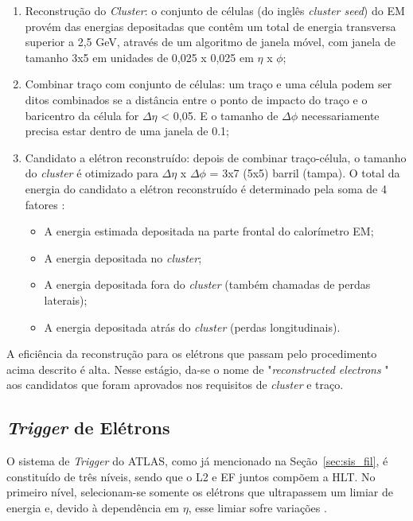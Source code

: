 \begin{enumerate}
  \item Reconstrução do \emph{Cluster}: o conjunto de células (do inglês \emph{cluster seed}) do EM provém das energias depositadas que contêm um total de energia transversa superior a 2,5 GeV, através de um algoritmo de janela móvel, com janela de tamanho 3x5 em unidades de 0,025 x 0,025 em $\eta$ x $\phi$;
  \item Combinar traço com conjunto de células: um traço e uma célula podem ser ditos combinados se a distância entre o ponto de impacto do traço e o baricentro da célula for $\Delta$$\eta$ < 0,05. E o tamanho de $\Delta$$\phi$ necessariamente precisa estar dentro de uma janela de 0.1;
  \item Candidato a elétron reconstruído: depois de combinar traço-célula, o tamanho do \emph{cluster} é otimizado para $\Delta$$\eta$ x $\Delta$$\phi$ = 3x7 (5x5) barril (tampa). O total da energia do candidato a elétron reconstruído é determinado pela soma de 4 fatores \cite{abat2008expected}:
      \begin{itemize}
        \item A energia estimada depositada na parte frontal do calorímetro EM;
        \item A energia depositada no \emph{cluster};
        \item A energia depositada fora do \emph{cluster} (também chamadas de perdas laterais);
        \item A energia depositada atrás do \emph{cluster} (perdas longitudinais).
      \end{itemize}
\end{enumerate}
	
A eficiência da reconstrução para os elétrons que passam pelo procedimento acima descrito é alta. Nesse estágio, da-se o nome de "\emph{reconstructed electrons }" aos candidatos que foram aprovados nos requisitos de \emph{cluster} e traço.

\subsection{\emph{Trigger} de Elétrons}
	
O sistema de \emph{Trigger} do ATLAS, como já mencionado na Seção~\ref{sec:sis_fil}, é constituído de três níveis, sendo que o L2 e EF juntos compõem a \ac{HLT}. No primeiro nível, selecionam-se somente os elétrons que ultrapassem um limiar de energia e, devido à dependência em $\eta$, esse limiar sofre variações \cite{alison2014road}.

